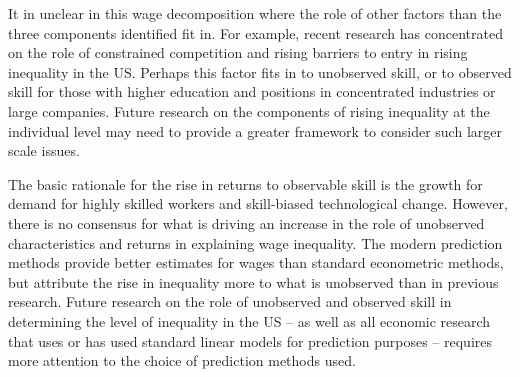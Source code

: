 \documentclass[notitlepage,12pt]{article}
\begin{document}
It in unclear in this wage decomposition where the role of other factors than the three components identified fit in.  For example, recent research has concentrated on the role of constrained competition and rising barriers to entry in rising inequality in the US.  Perhaps this factor fits in to unobserved skill, or to observed skill for those with higher education and positions in concentrated industries or large companies.  Future research on the components of rising inequality at the individual level may need to provide a greater framework to consider such larger scale issues.

The basic rationale for the rise in returns to observable skill is the growth for demand for highly skilled workers and skill-biased technological change.  However, there is no consensus for what is driving an increase in the role of unobserved characteristics and returns in explaining wage inequality. The modern prediction methods provide better estimates for wages than standard econometric methods, but attribute the rise in inequality more to what is unobserved than in previous research.  Future research on the role of unobserved and observed skill in determining the level of inequality in the US -- as well as all economic research that uses or has used standard linear models for prediction purposes -- requires more attention to the choice of prediction methods used.



\end{document}

